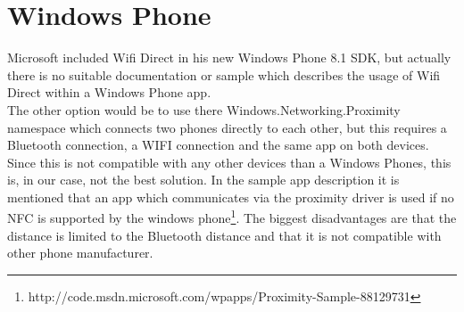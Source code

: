 \section{Windows Phone}
\label{sec:WindowsPhone}
Microsoft included Wifi Direct in his new Windows Phone 8.1 SDK, but actually there is no suitable documentation or sample which describes the usage of Wifi Direct within a Windows Phone app.\\
The other option would be to use there Windows.Networking.Proximity namespace which connects two phones directly to each other, but this requires a Bluetooth connection, a WIFI connection and the same app on both devices. Since this is not compatible with any other devices than a Windows Phones, this is, in our case, not the best solution. In the sample app description it is mentioned that an app which communicates via the proximity driver is used if no NFC is supported by the windows phone\footnote{http://code.msdn.microsoft.com/wpapps/Proximity-Sample-88129731}. The biggest disadvantages are that the distance is limited to the Bluetooth distance and that it is not compatible with other phone manufacturer.